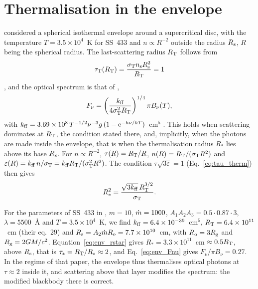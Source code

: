 
\section{Thermalisation in the envelope}
\label{app:envelope}

\citet{Lipunova1999} considered a spherical isothermal envelope around a supercritical disc, with the temperature $T = 3.5\times10^4$~K for SS~433 and $n \propto R^{-2}$ outside the radius $R_{\rm s}$, $R$ being the spherical radius.
The last-scattering radius $R_{\rm T}$ follows from
\begin{equation}
\tau_{\rm T}(R_{\rm T}) = \frac{\sigma_{\rm T} n_{\rm s} R_{\rm s}^2}{R_{\rm T}} = 1
\label{eq:env_RT}
\end{equation}
\citep[][eq.~28]{Lipunova1999}, and the optical spectrum is that of \citet{ZeldovichShakura1969},
\begin{equation}
F_\nu = \left(\frac{k_{\rm ff}}{4\sigma_{\rm T}^2 R_{\rm T}}\right)^{1/4} \pi B_\nu(T) ,
\label{eq:env_Fnu}
\end{equation}
with $k_{\rm ff} = 3.69\times10^8\,T^{-1/2}\nu^{-3}g\,(1 - {\rm e}^{-h\nu/kT})$~cm$^5$ \citep[][eq.~30]{Lipunova1999}.
This holds when scattering dominates at $R_{\rm T}$, the condition stated there, and, implicitly, when the photons are made inside the envelope, that is when the thermalisation radius $R_*$ lies above its base $R_{\rm s}$.
For $n \propto R^{-2}$, $\tau(R) = R_{\rm T}/R$, $n(R) = R_{\rm T}/(\sigma_{\rm T} R^2)$ and $\varepsilon(R) = k_{\rm ff}\,n/\sigma_{\rm T} = k_{\rm ff}R_{\rm T}/(\sigma_{\rm T}^2 R^2)$.
The condition $\tau\sqrt{3\varepsilon} = 1$ (Eq.~\ref{eq:tau_therm}) then gives
\begin{equation}
R_*^2 = \frac{\sqrt{3k_{\rm ff}}\,R_{\rm T}^{3/2}}{\sigma_{\rm T}} .
\label{eq:env_rstar}
\end{equation}

For the parameters of SS~433 in \citet{Lipunova1999}, $m = 10$, $\dot m = 1000$, $A_1A_2A_3 = 0.5\cdot0.87\cdot3$, $\lambda = 5500$~\AA{} and $T = 3.5\times10^4$~K, we find $k_{\rm ff} = 6.4\times10^{-39}$~cm$^5$, $R_{\rm T} = 6.4\times10^{11}$~cm (their eq.~29) and $R_{\rm s} = A_2\dot m R_{\rm o} = 7.7\times10^{10}$~cm, with $R_{\rm o} = 3R_{\rm g}$ and $R_{\rm g} = 2GM/c^2$.
Equation~\eqref{eq:env_rstar} gives $R_* = 3.3\times10^{11}$~cm $\approx 0.5R_{\rm T}$, above $R_{\rm s}$, that is $\tau_* = R_{\rm T}/R_* \approx 2$, and Eq.~\eqref{eq:env_Fnu} gives $F_\nu/\pi B_\nu = 0.27$.
In the regime of that paper, the envelope thus thermalises optical photons at $\tau \approx 2$ inside it, and scattering above that layer modifies the spectrum: the modified blackbody there is correct.

